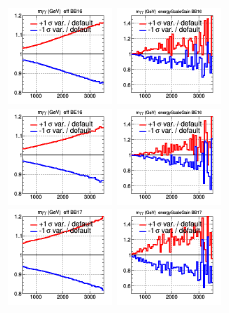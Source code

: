 
\begin{figure}[!htbp]
\centering
\includegraphics[width=0.24\linewidth, height=1in]{fig/spectra__eff_BB16_ADDGRW.png}
\includegraphics[width=0.24\linewidth, height=1in]{fig/spectra__energyScaleGain_BB16_ADDGRW.png}\\
\includegraphics[width=0.24\linewidth, height=1in]{fig/spectra__eff_BE16_ADDGRW.png}
\includegraphics[width=0.24\linewidth, height=1in]{fig/spectra__energyScaleGain_BE16_ADDGRW.png}\\
\includegraphics[width=0.24\linewidth, height=1in]{fig/spectra__eff_BB17_ADDGRW.png}
\includegraphics[width=0.24\linewidth, height=1in]{fig/spectra__energyScaleGain_BB17_ADDGRW.png}\\

\end{figure}
